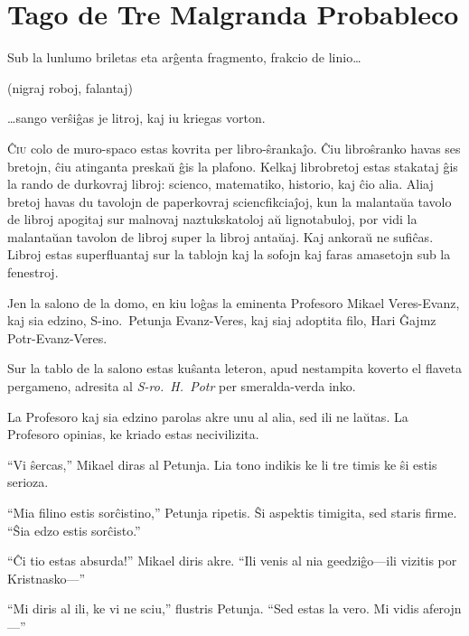 \chapter{Tago de Tre Malgranda Probableco}

\begin{chapterOpeningQuote}
\noindent
Sub la lunlumo briletas eta arĝenta fragmento, frakcio de linio…

\vspace*{2ex}
(nigraj roboj, falantaj)

\vspace*{2ex}
…sango verŝiĝas je litroj, kaj iu kriegas vorton.
\end{chapterOpeningQuote}

\lettrine{Ĉ}{iu} colo de muro-spaco estas kovrita per libro-ŝrankaĵo.
Ĉiu libroŝranko havas ses bretojn, ĉiu atinganta preskaŭ ĝis la plafono.
Kelkaj librobretoj estas stakataj ĝis la rando de durkovraj libroj: scienco, matematiko, historio, kaj ĉio alia.
Aliaj bretoj havas du tavolojn de paperkovraj sciencfikciaĵoj, kun la malantaŭa tavolo de libroj apogitaj sur malnovaj naztukskatoloj aŭ lignotabuloj, por vidi la malantaŭan tavolon de libroj super la libroj antaŭaj.
Kaj ankoraŭ ne sufiĉas.
Libroj estas superfluantaj sur la tablojn kaj la sofojn kaj faras amasetojn sub la fenestroj.

Jen la salono de la domo, en kiu loĝas la eminenta Profesoro Mikael Veres\nobreakdash-Evanz, kaj sia edzino, S\nobreakdash-ino.~Petunja Evanz\nobreakdash-Veres, kaj siaj adoptita filo, Hari Ĝajmz Potr\nobreakdash-Evanz\nobreakdash-Veres.

Sur la tablo de la salono estas kuŝanta leteron, apud nestampita koverto el flaveta pergameno, adresita al \emph{S\nobreakdash-ro.~H.~Potr} per smeralda-verda inko.

La Profesoro kaj sia edzino parolas akre unu al alia, sed ili ne laŭtas.
La Profesoro opinias, ke kriado estas necivilizita.

“Vi ŝercas,” Mikael diras al Petunja.
Lia tono indikis ke li tre timis ke ŝi estis serioza.

“Mia filino estis sorĉistino,” Petunja ripetis.
Ŝi aspektis timigita, sed staris firme.
“Ŝia edzo estis sorĉisto.”

“Ĉi tio estas absurda!” Mikael diris akre.
“Ili venis al nia geedziĝo—ili vizitis por Kristnasko—”

“Mi diris al ili, ke vi ne sciu,” flustris Petunja.
“Sed estas la vero. Mi vidis aferojn—”

